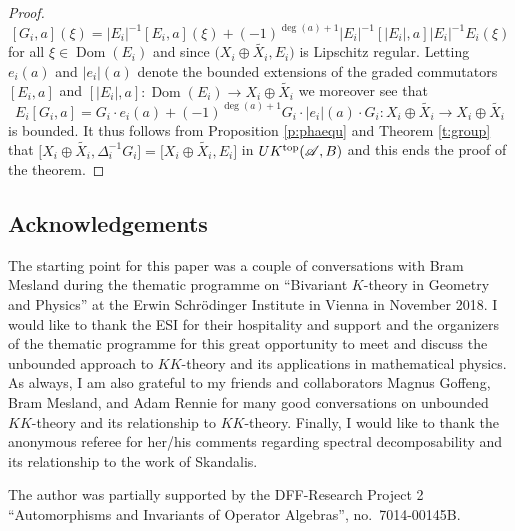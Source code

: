\documentclass[pdftex]{sigma}
\numberwithin{equation}{section}
\newcommand{\cd}{\cdot}
\newcommand{\op}{\oplus}
\newcommand{\De}{\Delta}
\newcommand{\s}[1]{\mathscr{#1}}
\newcommand{\wit}{\widetilde}
\begin{document}
\begin{proof}
\[
[G_i,a](\xi) = |E_i|^{-1} [E_i,a](\xi) + (-1)^{\deg (a) + 1} |E_i|^{-1}[|E_i|, a] |E_i|^{-1} E_i(\xi)
\]
for all $\xi \in \operatorname{Dom}(E_i)$ and since $\big(X_i \op \wit{X_i}, E_i\big)$ is Lipschitz regular. Letting $e_i(a)$ and $|e_i|(a)$ denote the bounded extensions of the graded commutators $[E_i,a]$ and $[|E_i|,a]\colon \operatorname{Dom}(E_i) \to X_i \op \wit{X_i}$ we moreover see that
\[
E_i [G_i,a] = G_i \cd e_i(a) + (-1)^{\deg (a) + 1} G_i \cd |e_i|(a) \cd G_i\colon X_i \op \wit{X_i} \to X_i \op \wit{X_i}
\]
is bounded. It thus follows from Proposition \ref{p:phaequ} and Theorem \ref{t:group} that $\big[X_i \op \wit{X_i}, \De_i^{-1} G_i\big] = \big[X_i \op \wit{X_i}, E_i\big]$ in $UK^{{\rm top}}(\s A,B)$ and this ends the proof of the theorem.
\end{proof}

\subsection*{Acknowledgements}
The starting point for this paper was a couple of conversations with Bram Mesland during the thematic programme on ``Bivariant $K$-theory in Geometry and Physics'' at the Erwin Schr\"odinger Institute in Vienna in November 2018. I would like to thank the ESI for their hospitality and support and the organizers of the thematic programme for this great opportunity to meet and discuss the unbounded approach to $KK$-theory and its applications in mathematical physics. As always, I am also grateful to my friends and collaborators Magnus Goffeng, Bram Mesland, and Adam Rennie for many good conversations on unbounded $KK$-theory and its relationship to $KK$-theory. Finally, I would like to thank the anonymous referee for her/his comments regarding spectral decomposability and its relationship to the work of Skandalis.

The author was partially supported by the DFF-Research Project 2 ``Automorphisms and Invariants of Operator Algebras'', no.~7014-00145B.
\end{document}
